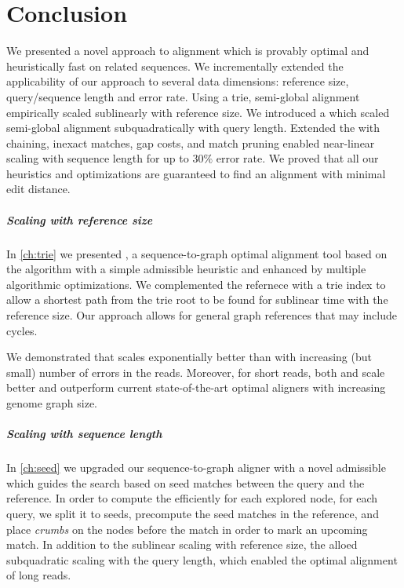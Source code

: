 \chapter*{Conclusion} \label{ch:conclusion}

We presented a novel \A approach to alignment which is provably optimal and
heuristically fast on related sequences. We incrementally extended the
applicability of our approach to several data dimensions: reference size,
query/sequence length and error rate. Using a trie, semi-global alignment
empirically scaled sublinearly with reference size. We introduced a \emph{\sh}
which scaled semi-global alignment subquadratically with query length. Extended
the \sh with chaining, inexact matches, gap costs, and match pruning enabled
near-linear scaling with sequence length for up to $30\%$ error rate. We proved
that all our heuristics and optimizations are guaranteed to find an alignment
with minimal edit distance.

\paragraph{Scaling with reference size}

In \cref{ch:trie} we presented \astarix, a sequence-to-graph optimal alignment
tool based on the \A algorithm with a simple admissible heuristic and enhanced
by multiple algorithmic optimizations. We complemented the refernece with a trie
index to allow a shortest path from the trie root to be found for sublinear time
with the reference size. Our approach allows for general graph references that
may include cycles.

We demonstrated that \astarix scales exponentially better than \dijkstra with
increasing (but small) number of errors in the reads. Moreover, for short reads,
both \astarix and \dijkstra scale better and outperform current state-of-the-art
optimal aligners with increasing genome graph size.

\paragraph{Scaling with sequence length}

In \cref{ch:seed} we upgraded our sequence-to-graph aligner \astarix with a
novel admissible \emph{\sh} which guides the search based on seed matches
between the query and the reference. In order to compute the \sh efficiently for
each explored node, for each query, we split it to seeds, precompute the seed
matches in the reference, and place \emph{crumbs} on the nodes before the match
in order to mark an upcoming match. In addition to the sublinear scaling with
reference size, the \sh alloed subquadratic scaling with the query length, which
enabled the optimal alignment of long reads. 

